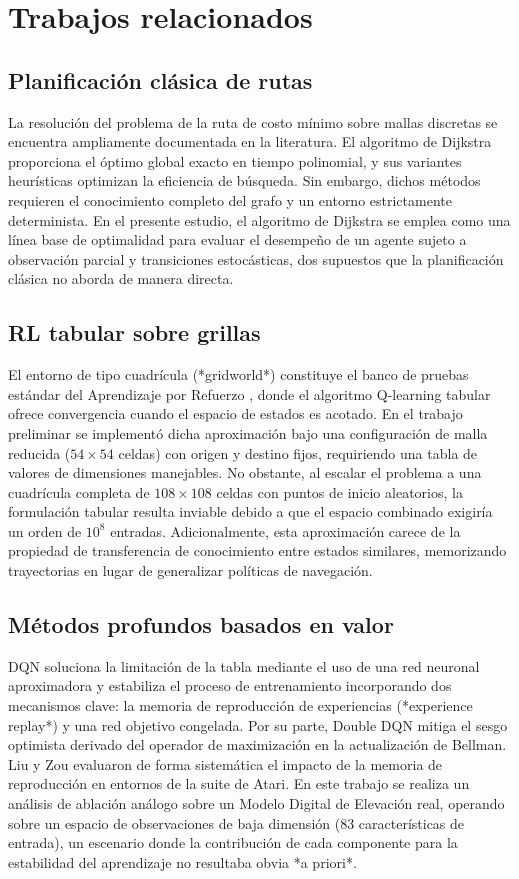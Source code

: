 \section{Trabajos relacionados}
\label{sec:related}

\subsection{Planificación clásica de rutas}
La resolución del problema de la ruta de costo mínimo sobre mallas discretas se encuentra ampliamente documentada en la literatura. El algoritmo de Dijkstra \cite{dijkstra1959} proporciona el óptimo global exacto en tiempo polinomial, y sus variantes heurísticas optimizan la eficiencia de búsqueda. Sin embargo, dichos métodos requieren el conocimiento completo del grafo y un entorno estrictamente determinista. En el presente estudio, el algoritmo de Dijkstra se emplea como una línea base de optimalidad para evaluar el desempeño de un agente sujeto a observación parcial y transiciones estocásticas, dos supuestos que la planificación clásica no aborda de manera directa.

\subsection{RL tabular sobre grillas}
El entorno de tipo cuadrícula (*gridworld*) constituye el banco de pruebas estándar del Aprendizaje por Refuerzo \cite{sutton2018}, donde el algoritmo Q-learning tabular ofrece convergencia cuando el espacio de estados es acotado. En el trabajo preliminar se implementó dicha aproximación bajo una configuración de malla reducida ($54\times54$ celdas) con origen y destino fijos, requiriendo una tabla de valores de dimensiones manejables. No obstante, al escalar el problema a una cuadrícula completa de $108\times108$ celdas con puntos de inicio aleatorios, la formulación tabular resulta inviable debido a que el espacio combinado exigiría un orden de $10^8$ entradas. Adicionalmente, esta aproximación carece de la propiedad de transferencia de conocimiento entre estados similares, memorizando trayectorias en lugar de generalizar políticas de navegación.

\subsection{Métodos profundos basados en valor}
DQN \cite{mnih2015} soluciona la limitación de la tabla mediante el uso de una red neuronal aproximadora y estabiliza el proceso de entrenamiento incorporando dos mecanismos clave: la memoria de reproducción de experiencias (*experience replay*) y una red objetivo congelada. Por su parte, Double DQN \cite{vanhasselt2016} mitiga el sesgo optimista derivado del operador de maximización en la actualización de Bellman. Liu y Zou \cite{liu2018} evaluaron de forma sistemática el impacto de la memoria de reproducción en entornos de la suite de Atari. En este trabajo se realiza un análisis de ablación análogo sobre un Modelo Digital de Elevación real, operando sobre un espacio de observaciones de baja dimensión (83 características de entrada), un escenario donde la contribución de cada componente para la estabilidad del aprendizaje no resultaba obvia *a priori*.

